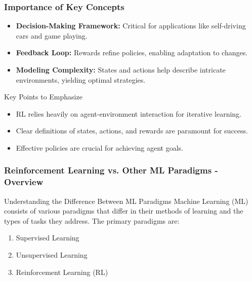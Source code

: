 \documentclass[aspectratio=169]{beamer}
\begin{document}
\begin{frame}[fragile]
    \frametitle{Importance of Key Concepts}
    \begin{itemize}
        \item \textbf{Decision-Making Framework:} Critical for applications like self-driving cars and game playing.
        \item \textbf{Feedback Loop:} Rewards refine policies, enabling adaptation to changes.
        \item \textbf{Modeling Complexity:} States and actions help describe intricate environments, yielding optimal strategies.
    \end{itemize}
    \begin{block}{Key Points to Emphasize}
        \begin{itemize}
            \item RL relies heavily on agent-environment interaction for iterative learning.
            \item Clear definitions of states, actions, and rewards are paramount for success.
            \item Effective policies are crucial for achieving agent goals.
        \end{itemize}
    \end{block}
\end{frame}

\begin{frame}[fragile]
    \frametitle{Reinforcement Learning vs. Other ML Paradigms - Overview}
    \begin{block}{Understanding the Difference Between ML Paradigms}
        Machine Learning (ML) consists of various paradigms that differ in their methods of learning and the types of tasks they address. The primary paradigms are:
    \end{block}
    \begin{enumerate}
        \item Supervised Learning
        \item Unsupervised Learning
        \item Reinforcement Learning (RL)
    \end{enumerate}
\end{frame}
\end{document}
